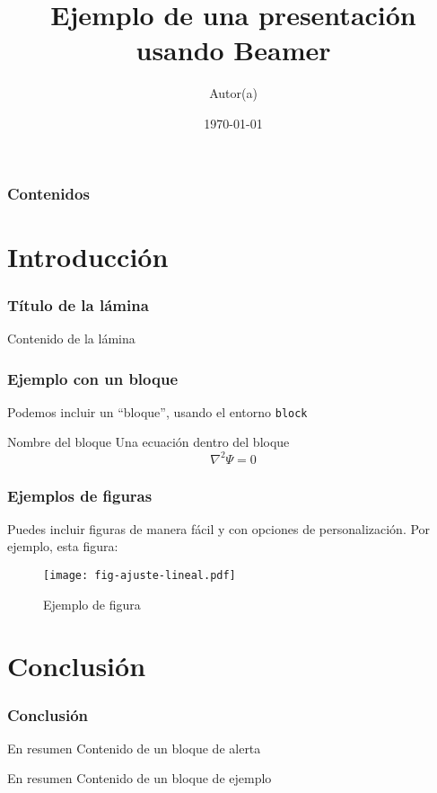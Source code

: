 \documentclass[colorlinks,aspectratio=169]{beamer}
\begin{document}
\title{Ejemplo de una presentación usando Beamer}
\author[iniciales de autor(a)]{Autor(a)} 
\date{\today}
\frame{\titlepage}

\begin{frame}
\frametitle{Contenidos}
\tableofcontents
\end{frame}

\section{Introducción}
\begin{frame}\frametitle{Título de la lámina}
Contenido de la lámina
\end{frame}

\begin{frame}\frametitle{Ejemplo con un bloque}
Podemos incluir un ``bloque'', usando el entorno \texttt{block}
\begin{block}{Nombre del bloque}
Una ecuación dentro del bloque
\begin{equation}
\nabla^2\Psi=0
\end{equation}
\end{block}
\end{frame}

\begin{frame}
\frametitle{Ejemplos de figuras}
Puedes incluir figuras de manera fácil y con opciones de personalización. Por ejemplo, esta figura:
\begin{figure}[ht]
\centering
\texttt{[image: fig-ajuste-lineal.pdf]}
\caption{Ejemplo de figura}
\label{fig:ejemplo}
\end{figure}
\end{frame}

\section{Conclusión}

\begin{frame}
\frametitle{Conclusión}
\begin{alertblock}{En resumen}
Contenido de un bloque de alerta
\end{alertblock}

\begin{exampleblock}{En resumen}
Contenido de un bloque de ejemplo
\end{exampleblock}
\end{frame}
\end{document}
